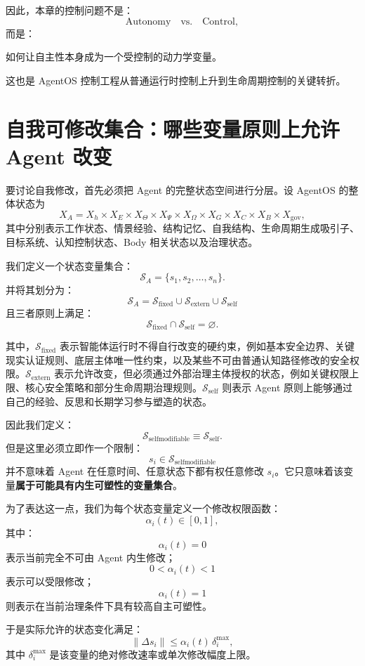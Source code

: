 因此，本章的控制问题不是：
\[
\text{Autonomy}\quad \text{vs.}\quad \text{Control},
\]
而是：
\begin{statementbox}
如何让自主性本身成为一个受控制的动力学变量。
\end{statementbox}
这也是 AgentOS 控制工程从普通运行时控制上升到生命周期控制的关键转折。

\section{自我可修改集合：哪些变量原则上允许 Agent 改变}

要讨论自我修改，首先必须把 Agent 的完整状态空间进行分层。设 AgentOS 的整体状态为
\[
X_A
=
X_h
\times
X_E
\times
X_\Theta
\times
X_\Psi
\times
X_\Omega
\times
X_G
\times
X_C
\times
X_B
\times
X_{\mathrm{gov}},
\]
其中分别表示工作状态、情景经验、结构记忆、自我结构、生命周期生成吸引子、目标系统、认知控制状态、Body 相关状态以及治理状态。

我们定义一个状态变量集合：
\[
\mathcal S_A
=
\{s_1,s_2,\ldots,s_n\}.
\]
并将其划分为：
\[
\boxed{
\mathcal S_A
=
\mathcal S_{\mathrm{fixed}}
\cup
\mathcal S_{\mathrm{extern}}
\cup
\mathcal S_{\mathrm{self}}
}
\]
且三者原则上满足：
\[
\mathcal S_{\mathrm{fixed}}
\cap
\mathcal S_{\mathrm{self}}
=
\varnothing.
\]

其中，$\mathcal S_{\mathrm{fixed}}$ 表示智能体运行时不得自行改变的硬约束，例如基本安全边界、关键现实认证规则、底层主体唯一性约束，以及某些不可由普通认知路径修改的安全权限。$\mathcal S_{\mathrm{extern}}$ 表示允许改变，但必须通过外部治理主体授权的状态，例如关键权限上限、核心安全策略和部分生命周期治理规则。$\mathcal S_{\mathrm{self}}$ 则表示 Agent 原则上能够通过自己的经验、反思和长期学习参与塑造的状态。

因此我们定义：
\[
\boxed{
\mathcal S_{\mathrm{selfmodifiable}}
\equiv
\mathcal S_{\mathrm{self}}.
}
\]
但是这里必须立即作一个限制：
\[
s_i\in\mathcal S_{\mathrm{selfmodifiable}}
\]
并不意味着 Agent 在任意时间、任意状态下都有权任意修改 $s_i$。它只意味着该变量\textbf{属于可能具有内生可塑性的变量集合}。

为了表达这一点，我们为每个状态变量定义一个修改权限函数：
\[
\alpha_i(t)
\in
[0,1],
\]
其中：
\[
\alpha_i(t)=0
\]
表示当前完全不可由 Agent 内生修改；
\[
0<\alpha_i(t)<1
\]
表示可以受限修改；
\[
\alpha_i(t)=1
\]
则表示在当前治理条件下具有较高自主可塑性。

于是实际允许的状态变化满足：
\[
\|\Delta s_i\|
\le
\alpha_i(t)\,\delta_i^{\max},
\]
其中 $\delta_i^{\max}$ 是该变量的绝对修改速率或单次修改幅度上限。


